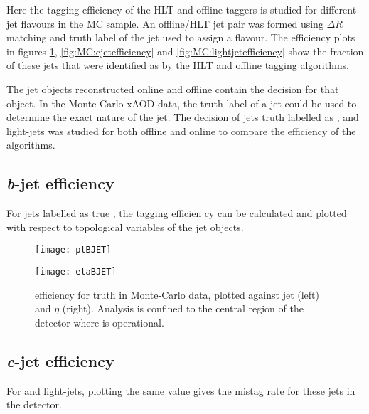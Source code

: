 	Here the tagging efficiency of the HLT and offline taggers is studied for different jet flavours in the MC sample. An offline/HLT jet pair was formed using $\Delta R$ matching and truth label of the jet used to assign a flavour. The efficiency plots in figures \ref{fig:MC:bjetefficiency}, \ref{fig:MC:cjetefficiency} and \ref{fig:MC:lightjetefficiency} show the fraction of these jets that were identified as \bjets by the HLT and offline tagging algorithms.
	
	The jet objects reconstructed online and offline contain the \btagging decision for that object. In the Monte-Carlo xAOD data, the truth label of a jet could be used to determine the exact nature of the jet. The \btagging decision of jets truth labelled as \bjets, \cjets and light-jets was studied for both offline and online to compare the efficiency of the algorithms. 

	\subsection{\textit{b}-jet efficiency}
	
	For jets labelled as true \bjets, the tagging efficien	cy can be calculated and plotted with respect to topological variables of the jet objects.

		\begin{figure}[h]
			\centering
			\begin{minipage}[h]{0.45\linewidth}
				\texttt{[image: ptBJET]}

			\end{minipage}
			\quad
			\begin{minipage}[h]{0.45\linewidth}
				\texttt{[image: etaBJET]}
			\end{minipage}
			\caption{\btagging efficiency for truth \bjets in Monte-Carlo data, plotted against jet \pt (left) and $\eta$ (right). Analysis is confined to the central region of the detector where \btagging is operational.}
			\label{fig:MC:bjetefficiency}
		\end{figure}


	\subsection{\textit{c}-jet efficiency}
	
	For \cjets and light-jets, plotting the same value gives the mistag rate for these jets in the detector. 

